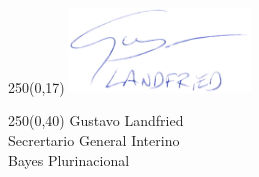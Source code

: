 \documentclass[a4paper,11pt]{letter}
\begin{document}
\begin{landscape}
\begin{textblock}{250}(0,17)
\phantom{.} \hfill \includegraphics[width=4.8cm]{firma.png}\hspace{2cm}\phantom{.} \\[0cm]
\end{textblock}
\begin{textblock}{250}(0,40)
 \phantom{.} \hfill Gustavo Landfried \hspace{2.5cm}\phantom{.}\\ \small
\phantom{.} \hfill Secrertario General Interino \hspace{2.5cm}\phantom{.}\\
\phantom{.} \hfill Bayes Plurinacional \hspace{2.5cm}\phantom{.}\\
\end{textblock}
%



\end{landscape}
\end{document}
